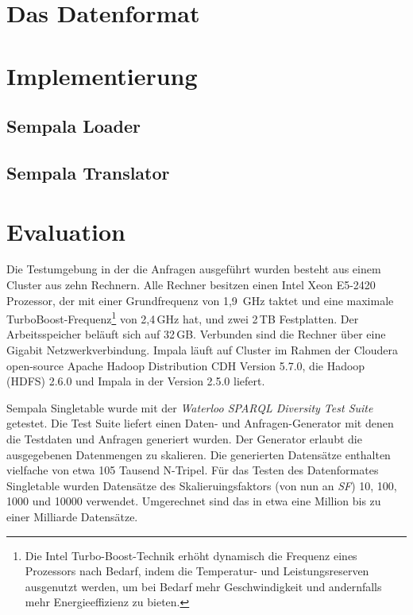 \documentclass[
  a4paper,
  twocolumn
]{scrartcl}
\begin{document}
\section{Das Datenformat}

\lipsum[1-2]

\section{Implementierung}

\lipsum[1-2]

\subsection{Sempala Loader}

\lipsum[1-2]

\subsection{Sempala Translator}

\lipsum[1-2]

\section{Evaluation}

Die Testumgebung in der die Anfragen ausgeführt wurden besteht aus einem Cluster aus zehn Rechnern.
Alle Rechner besitzen einen Intel Xeon E5-2420 Prozessor, der mit einer Grundfrequenz von 1,9\, GHz taktet und eine maximale TurboBoost-Frequenz\footnote{Die Intel Turbo-Boost-Technik erhöht dynamisch die Frequenz eines Prozessors nach Bedarf, indem die Temperatur- und Leistungsreserven ausgenutzt werden, um bei Bedarf mehr Geschwindigkeit und andernfalls mehr Energieeffizienz zu bieten.} von 2,4\,GHz hat, und zwei 2\,TB Festplatten.
Der Arbeitsspeicher beläuft sich auf 32\,GB.
Verbunden sind die Rechner über eine Gigabit Netzwerkverbindung.
Impala läuft auf Cluster im Rahmen der Cloudera open-source Apache Hadoop Distribution CDH Version 5.7.0, die Hadoop (HDFS) 2.6.0 und  Impala in der Version 2.5.0 liefert. 


Sempala Singletable wurde mit der \textit{Waterloo SPARQL Diversity Test Suite} getestet. Die Test Suite liefert einen Daten- und Anfragen-Generator mit denen die Testdaten und Anfragen generiert wurden. Der Generator erlaubt die ausgegebenen Datenmengen zu skalieren. Die generierten Datensätze enthalten vielfache von etwa 105 Tausend N-Tripel. Für das Testen des Datenformates Singletable wurden Datensätze des Skalieruingsfaktors (von nun an \textit{SF}) 10, 100, 1000 und 10000 verwendet. Umgerechnet sind das in etwa eine Million bis zu einer Milliarde Datensätze.
\end{document}
